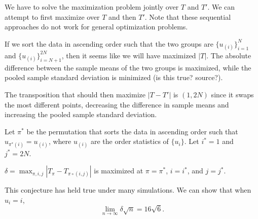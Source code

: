 We have to solve the maximization problem jointly over $T$ and $T'$.  We can
attempt to first maximize over $T$ and then $T'$.  Note that these sequential
approaches do not work for general optimization problems.

If we sort the data in ascending order such that the two groups are
$\{u_{(i)}\}_{i=1}^{N}$ and $\{u_{(i)}\}_{i=N+1}^{2N}$, then it seems like
we will have maximized $|T|$.  The absolute difference between the sample
means of the two groups is maximized, while the pooled sample standard
deviation is minimized (is this true? source?).

The transposition that should then maximize $|T - T'|$ is $(1, 2N)$ since it
swaps the most different points, decreasing the difference in sample means and
increasing the pooled sample standard deviation.

Let $\pi^*$ be the permutation that sorts the data in ascending order
such that $u_{\pi^*(i)} = u_{(i)}$, where $u_{(i)}$ are the order statistics
of $\{u_i\}$.  Let $i^* = 1$ and $j^* = 2N$.

\begin{conjecture}
  $\delta = \max_{\pi, i, j} |T_{\pi} - T_{\pi \circ (i, j)}|$ is maximized at
  $\pi = \pi^*$, $i = i^*$, and $j = j^*$.
\end{conjecture}

This conjecture has held true under many simulations.  We can show that when $u_i = i$,
\begin{equation*}
  \lim_{n \to \infty} \delta \sqrt{n} = 16 \sqrt{6}.
\end{equation*}